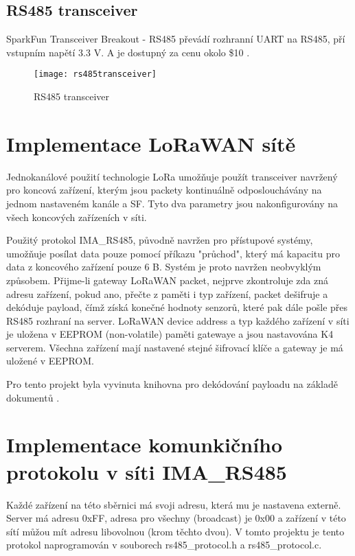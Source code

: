 \subsection{RS485 transceiver}
SparkFun Transceiver Breakout - RS485 převádí rozhranní UART na RS485, pří vstupním napětí 3.3 V. A je dostupný za cenu okolo \$10 \cite{rs485tr}.

\begin{figure}[!h]
    \centering
    \texttt{[image: rs485transceiver]}
    \caption{RS485 transceiver \cite{rs485tr}}
    \label{fig:rs485transceiver}
\end{figure}



\newpage
\section{Implementace LoRaWAN sítě}
Jednokanálové použití technologie LoRa umožňuje použít transceiver navržený pro koncová zařízení, 
kterým jsou packety kontinuálně odposlouchávány na jednom nastaveném kanále a SF. Tyto dva parametry  jsou nakonfigurovány na všech koncových zařízeních v síti.

Použitý protokol IMA\_RS485, původně navržen pro přístupové systémy, umožňuje posílat data pouze pomocí příkazu "průchod", který má kapacitu pro data z koncového zařízení pouze 6 B. Systém je proto navržen neobvyklým způsobem. Přijme-li gateway LoRaWAN packet, nejprve zkontroluje zda zná adresu zařízení, pokud ano, přečte z paměti i typ zařízení, packet dešifruje a dekóduje payload, čímž získá konečné hodnoty senzorů, které pak dále pošle přes RS485 rozhraní na server.
LoRaWAN device address a typ každého zařízení v síti je uložena v EEPROM (non-volatile) paměti gatewaye a jsou nastavována K4 serverem.
Všechna zařízení mají nastavené stejné šifrovací klíče a gateway je má uložené v EEPROM.

Pro tento projekt byla vyvinuta knihovna pro dekódování payloadu na základě dokumentů \cite{lwSpec} \cite{lwSecur}.


\section{Implementace komunkičního protokolu v síti IMA\_RS485}
Každé zařízení na této sběrnici má svoji adresu, která mu je nastavena externě. Server má adresu  0xFF, adresa pro všechny (broadcast) je 0x00 a zařízení v této sítí můžou mít adresu libovolnou (krom těchto dvou). V tomto projektu je tento protokol naprogramován v souborech rs485\_protocol.h a rs485\_protocol.c.

